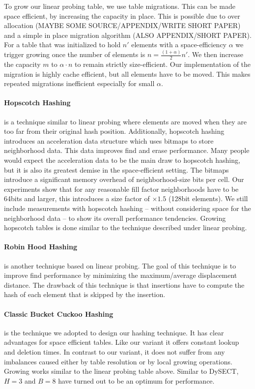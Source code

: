 \documentclass[a4paper,UKenglish]{lipics-v2016}
\begin{document}
To grow our linear probing table, we use table migrations.  This can
be made space efficient, by increasing the capacity in place.  This is
possible due to over allocation (MAYBE SOME SOURCE/APPENDIX/WRITE
SHORT PAPER) and a simple in place migration algorithm (ALSO
APPENDIX/SHORT PAPER).  For a table that was initialized to hold $n'$
elements with a space-efficiency $\alpha$ we trigger growing once the
number of elements is $n = \frac{(1+\alpha)}{2}n'$. We then increase
the capacity $m$ to $\alpha\cdot n$ to remain strictly size-efficient.
Our implementation of the migration is highly cache efficient, but
all elements have to be moved.  This makes repeated migrations inefficient
especially for small $\alpha$.

\paragraph*{Hopscotch Hashing} is a technique similar to linear probing where
elements are moved when they are too far from their original hash
position.  Additionally, hopscotch hashing introduces an acceleration
data structure which uses bitmaps to store neighborhood data. This
data improves find and erase performance.  Many people would expect
the acceleration data to be the main draw to hopscotch hashing, but it
is also its greatest demise in the space-efficient setting.  The
bitmaps introduce a significant memory overhead of neighborhood-size
bits per cell.  Our experiments show that for any reasonable fill
factor neighborhoods have to be 64bits and larger, this introduces a
size factor of $\times1.5$ (128bit elements).  We still include
measurements with hopscotch hashing -- without considering space for
the neighborhood data -- to show its overall performance tendencies.
Growing hopscotch tables is done similar to the technique described
under linear probing.

\paragraph*{Robin Hood Hashing} is another technique based on linear probing. The
goal of this technique is to improve find performance by minimizing
the maximum/average displacement distance.  The drawback of this technique is
that insertions have to compute the hash of each element that is
skipped by the insertion.

\paragraph*{Classic Bucket Cuckoo Hashing} is the technique we adopted to
design our hashing technique.  It has clear advantages for space
efficient tables.  Like our variant it offers constant lookup and
deletion times.  In contrast to our variant, it does not suffer from
any imbalances caused either by table resolution or by local growing
operations.  Growing works similar to the linear probing table above.
Similar to DySECT, $H=3$ and $B=8$ have turned out to be an optimum
for performance.
\end{document}
